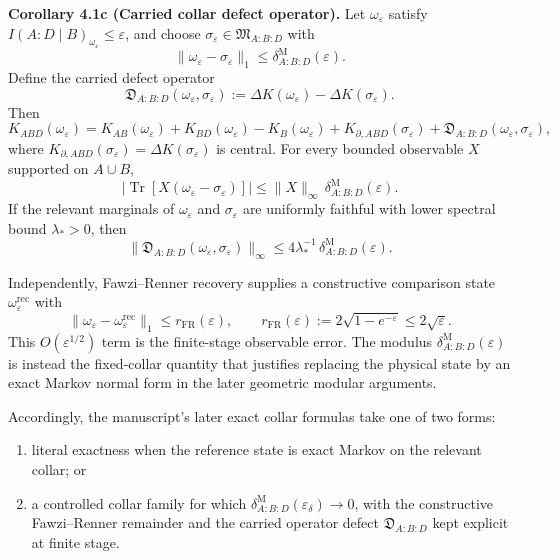\textbf{Corollary 4.1c (Carried collar defect operator).} Let \(\omega_\varepsilon\) satisfy \(I(A:D\mid B)_{\omega_\varepsilon}\le \varepsilon\), and choose \(\sigma_\varepsilon\in\mathfrak M_{A:B:D}\) with
\[
\|\omega_\varepsilon-\sigma_\varepsilon\|_1
\le
\delta^{\mathrm M}_{A:B:D}(\varepsilon).
\]
Define the carried defect operator
\[
\mathfrak D_{A:B:D}(\omega_\varepsilon,\sigma_\varepsilon)
:=
\Delta K(\omega_\varepsilon)-\Delta K(\sigma_\varepsilon).
\]
Then
\[
K_{ABD}(\omega_\varepsilon)
=
K_{AB}(\omega_\varepsilon)+K_{BD}(\omega_\varepsilon)-K_B(\omega_\varepsilon)
+K_{\partial,ABD}(\sigma_\varepsilon)
+\mathfrak D_{A:B:D}(\omega_\varepsilon,\sigma_\varepsilon),
\]
where \(K_{\partial,ABD}(\sigma_\varepsilon)=\Delta K(\sigma_\varepsilon)\) is central. For every bounded observable \(X\) supported on \(A\cup B\),
\[
\left|
\operatorname{Tr}\!\left[X(\omega_\varepsilon-\sigma_\varepsilon)\right]
\right|
\le
\|X\|_\infty\,\delta^{\mathrm M}_{A:B:D}(\varepsilon).
\]
If the relevant marginals of \(\omega_\varepsilon\) and \(\sigma_\varepsilon\) are uniformly faithful with lower spectral bound \(\lambda_\ast>0\), then
\[
\|\mathfrak D_{A:B:D}(\omega_\varepsilon,\sigma_\varepsilon)\|_\infty
\le
4\lambda_\ast^{-1}\,\delta^{\mathrm M}_{A:B:D}(\varepsilon).
\]

Independently, Fawzi--Renner recovery supplies a constructive comparison state \(\omega^{\mathrm{rec}}_\varepsilon\) with
\[
\|\omega_\varepsilon-\omega^{\mathrm{rec}}_\varepsilon\|_1
\le
r_{\mathrm{FR}}(\varepsilon),
\qquad
r_{\mathrm{FR}}(\varepsilon):=2\sqrt{1-e^{-\varepsilon}}\le 2\sqrt{\varepsilon}.
\]
This \(O(\varepsilon^{1/2})\) term is the finite-stage observable error. The modulus \(\delta^{\mathrm M}_{A:B:D}(\varepsilon)\) is instead the fixed-collar quantity that justifies replacing the physical state by an exact Markov normal form in the later geometric modular arguments.

Accordingly, the manuscript's later exact collar formulas take one of two forms:
\begin{enumerate}
\item literal exactness when the reference state is exact Markov on the relevant collar; or
\item a controlled collar family for which \(\delta^{\mathrm M}_{A:B:D}(\varepsilon_\delta)\to0\), with the constructive Fawzi--Renner remainder and the carried operator defect \(\mathfrak D_{A:B:D}\) kept explicit at finite stage.
\end{enumerate}

